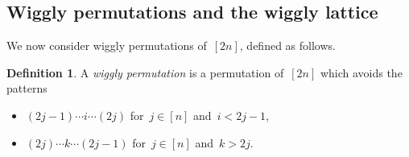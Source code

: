 \documentclass{amsart}
\theoremstyle{definition}
\newtheorem{definition}[theorem]{Definition}
\newcommand{\darkblue}{\color{darkblue}} %
\newcommand{\defn}[1]{\textsl{\darkblue #1}} %
\begin{document}

\subsection{Wiggly permutations and the wiggly lattice}
\label{subsec:wigglyPermutations}

We now consider wiggly permutations of~$[2n]$, defined as follows.

\begin{definition}
\label{def:wigglyPermutation}
A \defn{wiggly permutation} is a permutation of~$[2n]$ which avoids the patterns
\begin{itemize}
\item $(2j-1) \cdots i \cdots (2j)$ for~$j \in [n]$ and~$i < 2j-1$,
\item $(2j) \cdots k \cdots (2j-1)$ for~$j \in [n]$ and~$k > 2j$.
\end{itemize}
\end{definition}
\end{document}

